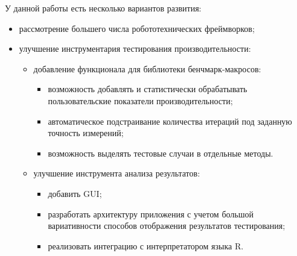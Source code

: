 У данной работы есть несколько вариантов развития:
\begin{itemize}
	\item рассмотрение большего числа робототехнических фреймворков;
	\item улучшение инструментария тестирования производительности:
	\begin{itemize}
		\item добавление функционала для библиотеки бенчмарк-макросов:
		\begin{itemize}
			\item возможность добавлять и статистически обрабатывать пользовательские показатели производительности;
			\item автоматическое подстраивание количества итераций под заданную точность измерений;
			\item возможность выделять тестовые случаи в отдельные методы.
		\end{itemize}
		\item улучшение инструмента анализа результатов:
		\begin{itemize}
			\item добавить GUI;
			\item разработать архитектуру приложения с учетом большой вариативности способов отображения результатов тестирования;
			\item реализовать интеграцию с интерпретатором языка R.
		\end{itemize}
	\end{itemize}
\end{itemize}
